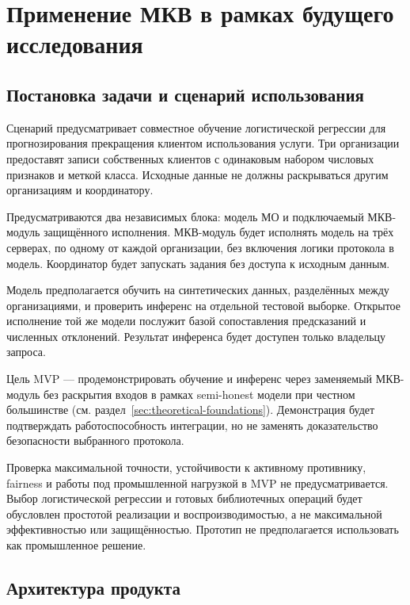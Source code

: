 \section{Применение МКВ в рамках будущего исследования}
\label{sec:future-research}
\setcounter{table}{3}

\subsection{Постановка задачи и сценарий использования}
\label{subsec:mvp-scenario}

Сценарий предусматривает совместное обучение логистической регрессии для прогнозирования прекращения клиентом использования услуги. Три организации предоставят записи собственных клиентов с одинаковым набором числовых признаков и меткой класса. Исходные данные не должны раскрываться другим организациям и координатору.

Предусматриваются два независимых блока: модель МО и подключаемый МКВ-модуль защищённого исполнения. МКВ-модуль будет исполнять модель на трёх серверах, по одному от каждой организации, без включения логики протокола в модель. Координатор будет запускать задания без доступа к исходным данным.

Модель предполагается обучить на синтетических данных, разделённых между организациями, и проверить инференс на отдельной тестовой выборке. Открытое исполнение той же модели послужит базой сопоставления предсказаний и численных отклонений. Результат инференса будет доступен только владельцу запроса.

Цель MVP --- продемонстрировать обучение и инференс через заменяемый МКВ-модуль без раскрытия входов в рамках semi-honest модели при честном большинстве (см. раздел~\ref{sec:theoretical-foundations}). Демонстрация будет подтверждать работоспособность интеграции, но не заменять доказательство безопасности выбранного протокола.

Проверка максимальной точности, устойчивости к активному противнику, fairness и работы под промышленной нагрузкой в MVP не предусматривается. Выбор логистической регрессии и готовых библиотечных операций будет обусловлен простотой реализации и воспроизводимостью, а не максимальной эффективностью или защищённостью. Прототип не предполагается использовать как промышленное решение.

\subsection{Архитектура продукта}
\label{subsec:product-architecture}


